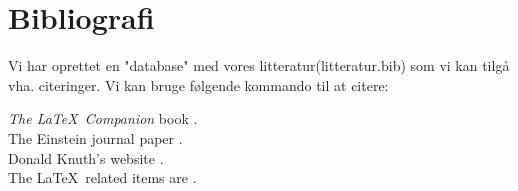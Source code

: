 \documentclass[class=report, crop=false]{standalone}
\begin{document}
    \section{Bibliografi}
    Vi har oprettet en "database"  med vores litteratur(litteratur.bib) som vi kan tilgå vha. citeringer. Vi kan bruge følgende kommando til at citere:
    \begin{tcblisting}{}
        \textit{The \LaTeX\ Companion} book \cite{latexcompanion}.\\
        The Einstein journal paper \cite{einstein}.\\
        Donald Knuth's website \cite{knuthwebsite}.\\
        The \LaTeX\ related items are \cite{latexcompanion,knuthwebsite}.\\
    \end{tcblisting}

    \medskip

    
    
\end{document}
